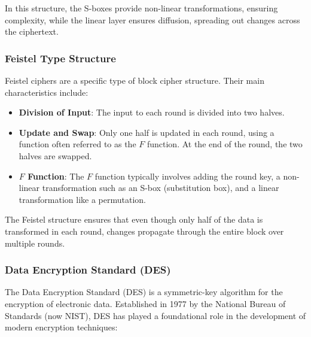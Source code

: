 \documentclass[12pt]{article}
\begin{document}
In this structure, the S-boxes provide non-linear transformations, ensuring complexity, while the linear layer ensures diffusion, spreading out changes across the ciphertext.

\subsubsection*{Feistel Type Structure}

Feistel ciphers are a specific type of block cipher structure. Their main characteristics include:

\begin{itemize}
    \item \textbf{Division of Input}: The input to each round is divided into two halves.

    \item \textbf{Update and Swap}: Only one half is updated in each round, using a function often referred to as the \(F\) function. At the end of the round, the two halves are swapped.

    \item \textbf{\(F\) Function}: The \(F\) function typically involves adding the round key, a non-linear transformation such as an S-box (substitution box), and a linear transformation like a permutation.
\end{itemize}

The Feistel structure ensures that even though only half of the data is transformed in each round, changes propagate through the entire block over multiple rounds.

\subsubsection*{Data Encryption Standard (DES)}

The Data Encryption Standard (DES) is a symmetric-key algorithm for the encryption of electronic data. Established in 1977 by the National Bureau of Standards (now NIST), DES has played a foundational role in the development of modern encryption techniques:
\end{document}
